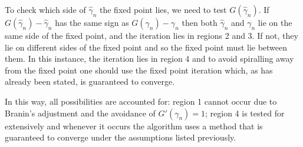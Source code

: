 \documentclass{article}
\begin{document}
To check which side of $\hat{\gamma}_n$ the fixed point lies, we need to test $G(\hat{\gamma}_n)$.
If $G(\hat{\gamma}_n) - \hat{\gamma}_n$ has the same sign as $G(\gamma_n) - \gamma_n$ then both $\hat{\gamma}_n$ and $\gamma_n$ lie on the same side of the fixed point, and the iteration lies in regions 2 and 3.
If not, they lie on different sides of the fixed point and so the fixed point must lie between them.
In this instance, the iteration lies in region 4 and to avoid spiralling away from the fixed point one should use the fixed point iteration which, as has already been stated, is guaranteed to converge.

In this way, all possibilities are accounted for: region 1 cannot occur due to Branin's adjustment and the avoidance of $G'(\gamma_n) = 1$; region 4 is tested for extensively and whenever it occurs the algorithm uses a method that is guaranteed to converge under the assumptions listed previously.



\end{document}

